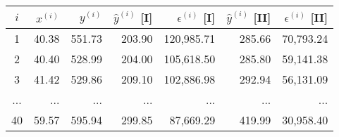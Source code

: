 \begin{tabular}{crrrrrr}
\toprule
 $i$ & $x^{(i)}$ & $y^{(i)}$ & $\hat y^{(i)}$ [I] & $\epsilon^{(i)}$ [I] & $\hat y^{(i)}$ [II] & $\epsilon^{(i)}$ [II] \\
\midrule
   1 &     40.38 &    551.73 &             203.90 &           120,985.71 &              285.66 &             70,793.24 \\
   2 &     40.40 &    528.99 &             204.00 &           105,618.50 &              285.80 &             59,141.38 \\
   3 &     41.42 &    529.86 &             209.10 &           102,886.98 &              292.94 &             56,131.09 \\
 ... &       ... &       ... &                ... &                  ... &                 ... &                   ... \\
  40 &     59.57 &    595.94 &             299.85 &            87,669.29 &              419.99 &             30,958.40 \\
\bottomrule
\end{tabular}
